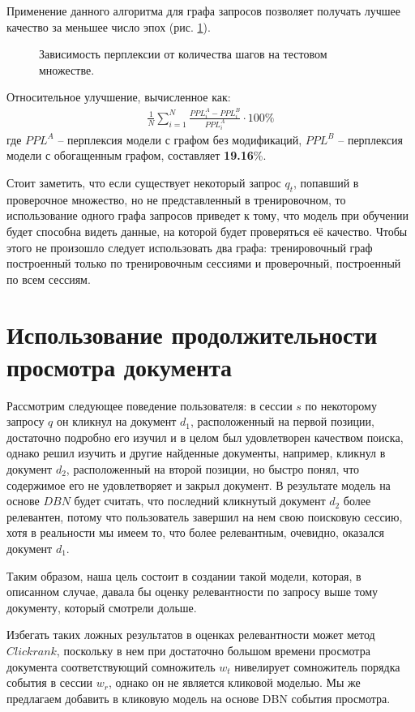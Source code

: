 \documentclass[diploma]{nanolab2015}
\begin{document}
Применение данного алгоритма для графа запросов позволяет получать лучшее качество за меньшее число эпох (рис. \ref{pic6}).

\begin{figure}[ht]
  \setcounter{figure}{5}
  
  \caption{Зависимость перплексии от количества шагов на тестовом множестве.}
  \label{pic6}
\end{figure}

Относительное улучшение, вычисленное как:
\begin{align}
  \frac{1}{N} \sum_{i=1}^{N} \frac{PPL_i^A - PPL_i^B}{PPL_i^A} \cdot 100\%
\end{align}
где $PPL^A$ -- перплексия модели с графом без модификаций, $PPL^B$ -- перплексия модели с обогащенным графом, составляет \textbf{19.16}\%.

Стоит заметить, что если существует некоторый запрос $q_t$, попавший в проверочное множество, но не представленный в тренировочном, то использование одного графа запросов приведет к тому, что модель при обучении будет способна видеть данные, на которой будет проверяться её качество. Чтобы этого не произошло следует использовать два графа: тренировочный граф построенный только по тренировочным сессиями и проверочный, построенный по всем сессиям.

\section{Использование продолжительности просмотра документа}
Рассмотрим следующее поведение пользователя: в сессии $s$ по некоторому запросу $q$ он кликнул на документ $d_1$, расположенный на первой позиции, достаточно подробно его изучил и в целом был удовлетворен качеством поиска, однако решил изучить и другие найденные документы, например, кликнул в документ $d_2$, расположенный на второй позиции, но быстро понял, что содержимое его не удовлетворяет и закрыл документ. В результате модель на основе $DBN$ будет считать, что последний кликнутый документ $d_2$ более релевантен, потому что пользователь завершил на нем свою поисковую сессию, хотя в реальности мы имеем то, что более релевантным, очевидно, оказался документ $d_1$.

Таким образом, наша цель состоит в создании такой модели, которая, в описанном случае, давала бы оценку релевантности по запросу выше тому документу, который смотрели дольше.

Избегать таких ложных результатов в оценках релевантности может метод $Clickrank$, поскольку в нем при достаточно большом времени просмотра документа соответствующий сомножитель $w_t$ нивелирует сомножитель порядка события в сессии $w_r$, однако он не является кликовой моделью. Мы же предлагаем добавить в кликовую модель на основе DBN события просмотра.
\end{document}
